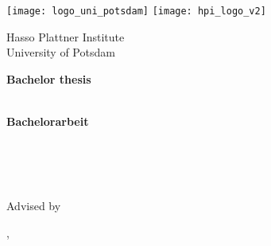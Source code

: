 \begin{titlepage}

\centering

\texttt{[image: logo\_uni\_potsdam]}
\hspace{2.5cm}
\texttt{[image: hpi\_logo\_v2]}
\vspace*{0.75cm}

\Large 
Hasso Plattner Institute\\
University of Potsdam

\vspace{1.5cm}

\Large
\textbf{Bachelor thesis}\\[0.5\baselineskip]
\LARGE
\textbf{\docTitle}\\[0.5\baselineskip]

\vspace{1.5cm}

\Large
\textbf{Bachelorarbeit}\\[0.5\baselineskip]
\LARGE
\textbf{\docTitleDE}\\[0.5\baselineskip]

\vspace{1.5cm}

\Large
\docAuthor\\
{\normalsize \docAuthorMail}\\

\vfill

\large
Advised by \docSupervisited\\
\docChair

\vspace{1cm}
\textsf{\docCity{}, \docDate}\\ %
\end{titlepage}
